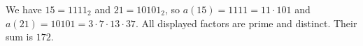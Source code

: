 We have $15=1111_2$ and $21=10101_2$, so $a(15)=1111=11\cdot101$ and $a(21)=10101=3\cdot7\cdot13\cdot37$. All displayed factors are prime and distinct. Their sum is $\boxed{172}$.
